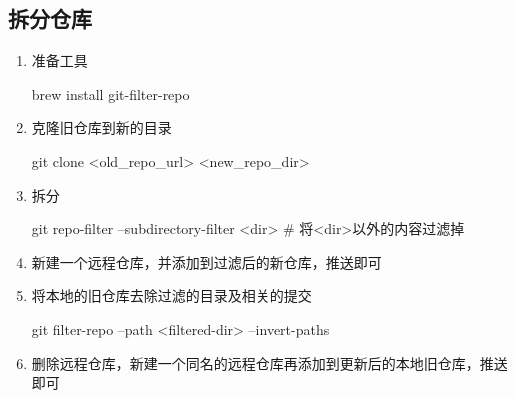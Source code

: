 \subsection{拆分仓库}
\begin{enumerate}
	\item 准备工具
	      \begin{shellcmd}
		brew install git-filter-repo
		\end{shellcmd}
	\item 克隆旧仓库到新的目录
	      \begin{shellcmd}
		git clone <old_repo_url> <new_repo_dir>
		\end{shellcmd}
	\item 拆分
	      \begin{shellcmd}
		git repo-filter --subdirectory-filter <dir>
		# 将<dir>以外的内容过滤掉
		\end{shellcmd}
	\item 新建一个远程仓库，并添加到过滤后的新仓库，推送即可
	\item 将本地的旧仓库去除过滤的目录及相关的提交
	      \begin{shellcmd}
		git filter-repo --path <filtered-dir> --invert-paths
		\end{shellcmd}
	\item 删除远程仓库，新建一个同名的远程仓库再添加到更新后的本地旧仓库，推送即可
\end{enumerate}
